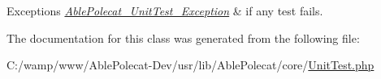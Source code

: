 \begin{DoxyExceptions}{Exceptions}
{\em \hyperlink{class_able_polecat___unit_test___exception}{Able\+Polecat\+\_\+\+Unit\+Test\+\_\+\+Exception}} & if any test fails. \\
\hline
\end{DoxyExceptions}


The documentation for this class was generated from the following file\+:\begin{DoxyCompactItemize}
\item 
C\+:/wamp/www/\+Able\+Polecat-\/\+Dev/usr/lib/\+Able\+Polecat/core/\hyperlink{_unit_test_8php}{Unit\+Test.\+php}\end{DoxyCompactItemize}
